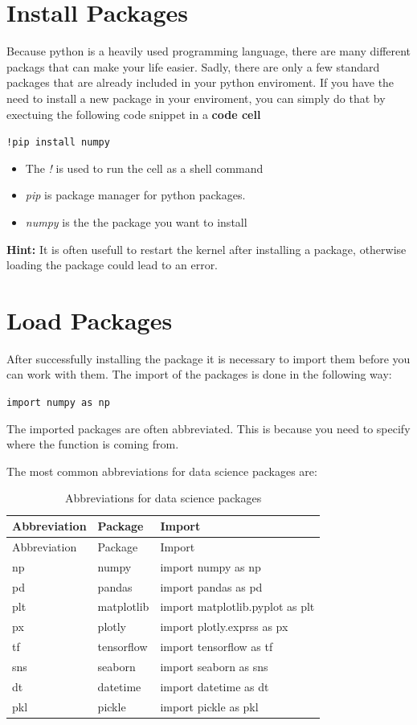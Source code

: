 \documentclass[
  letterpaper,
  DIV=11,
  numbers=noendperiod]{scrreprt}
\begin{document}
\hypertarget{install-packages}{%
\section{Install Packages}\label{install-packages}}

Because python is a heavily used programming language, there are many
different packags that can make your life easier. Sadly, there are only
a few standard packages that are already included in your python
enviroment. If you have the need to install a new package in your
enviroment, you can simply do that by exectuing the following code
snippet in a \textbf{code cell}

\texttt{!pip\ install\ numpy}

\begin{itemize}
\item
  The \emph{!} is used to run the cell as a shell command
\item
  \emph{pip} is package manager for python packages.
\item
  \emph{numpy} is the the package you want to install
\end{itemize}

\textbf{Hint:} It is often usefull to restart the kernel after
installing a package, otherwise loading the package could lead to an
error.

\hypertarget{load-packages}{%
\section{Load Packages}\label{load-packages}}

After successfully installing the package it is necessary to import them
before you can work with them. The import of the packages is done in the
following way:

\texttt{import\ numpy\ as\ np}

The imported packages are often abbreviated. This is because you need to
specify where the function is coming from.

The most common abbreviations for data science packages are:

\begin{longtable}[]{@{}lll@{}}
\caption{Abbreviations for data science packages}\tabularnewline
\toprule\noalign{}
Abbreviation & Package & Import \\
\midrule\noalign{}
\endfirsthead
\toprule\noalign{}
Abbreviation & Package & Import \\
\midrule\noalign{}
\endhead
\bottomrule\noalign{}
\endlastfoot
np & numpy & import numpy as np \\
pd & pandas & import pandas as pd \\
plt & matplotlib & import matplotlib.pyplot as plt \\
px & plotly & import plotly.exprss as px \\
tf & tensorflow & import tensorflow as tf \\
sns & seaborn & import seaborn as sns \\
dt & datetime & import datetime as dt \\
pkl & pickle & import pickle as pkl \\
\end{longtable}
\end{document}
